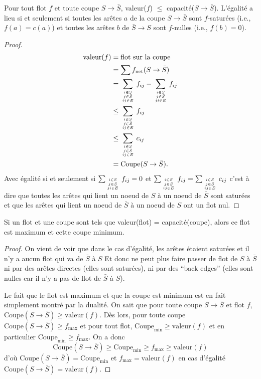 \begin{mylem}
  Pour tout flot $f$ et toute coupe $S \to \bar{S}$, valeur($f$) $\leq$ capacité($S \to \bar{S}$). L'égalité a lieu si et seulement si toutes les arêtes $a$ de la coupe $S \to \bar{S}$ sont $f$-saturées (i.e., $f(a) = c(a)$) et toutes les arêtes $b$ de $\bar{S} \to S$ sont $f$-nulles (i.e., $f(b) = 0$).

  \begin{proof}
    \begin{align*}
      \mathrm{valeur}(f) & = \text{flot sur la coupe}\\
             & = \sum f_{\mathrm{net}}(S \to \bar{S})\\
             & = \sum_{i \in S \atop {j \in \bar{S} \atop ij \in E}} f_{ij} - \sum_{i \in S \atop {j \in \bar{S} \atop ji \in E}} f_{ij}\\
             & \leq \sum_{i \in S \atop {j \in \bar{S} \atop ij \in E}} f_{ij}\\
             & \leq \sum_{i \in S \atop {j \in \bar{S} \atop ij \in E}} c_{ij}\\
             & = \text{Coupe}(S \to \bar{S}).
    \end{align*}
    Avec égalité si et seulement si $\sum_{i \in S\atop {j \in \bar{S}\atop ji \in E}} f_{ij} = 0$ et
    $\sum_{i \in S\atop {j \in \bar{S}\atop ij \in E}} f_{ij} = \sum_{i \in S\atop {j \in \bar{S}\atop ij \in E}} c_{ij}$
    c'est à dire que toutes les arêtes qui lient un noeud de $S$ à un noeud de $\bar{S}$ sont saturées
    et que les arêtes qui lient un noeud de $\bar{S}$ à un noeud de $S$ ont un flot nul.
  \end{proof}
\end{mylem}

\begin{mycorr}
  Si un flot et une coupe sont tels que valeur(flot) = capacité(coupe), alors ce flot est maximum et cette coupe minimum.
  \begin{proof}
    On vient de voir que dans le cas d'égalité, les arêtes étaient saturées et il n'y a aucun flot qui va de $\bar{S}$ à $S$
    Et donc ne peut plus faire passer de flot de $S$ à $\bar{S}$ ni par des arêtes directes (elles sont saturées),
    ni par des ``back edges'' (elles sont nulles car il n'y a pas de flot de $\bar{S}$ à $S$).

    Le fait que le flot est maximum et que la coupe est minimum est en fait simplement montré par la dualité.
    On sait que pour toute coupe $S\to\bar{S}$ et flot $f$, $\text{Coupe}(S\to\bar{S}) \geq \mathrm{valeur}(f)$.
    Dès lors, pour toute coupe $\text{Coupe}(S \to \bar{S}) \geq f_\mathrm{max}$ et pour tout flot,
    $\text{Coupe}_\mathrm{min} \geq \mathrm{valeur}(f)$ et en particulier $\text{Coupe}_\mathrm{min} \geq f_\mathrm{max}$.
    On a donc
    \[ \text{Coupe}(S \to \bar{S}) \geq \text{Coupe}_\mathrm{min} \geq f_\mathrm{max} \geq \mathrm{valeur}(f) \]
    d'où $\text{Coupe}(S \to \bar{S}) = \text{Coupe}_\mathrm{min}$ et
    $f_\mathrm{max} = \mathrm{valeur}(f)$ en cas d'égalité
    $\text{Coupe}(S \to \bar{S}) = \mathrm{valeur}(f)$.
  \end{proof}
\end{mycorr}

